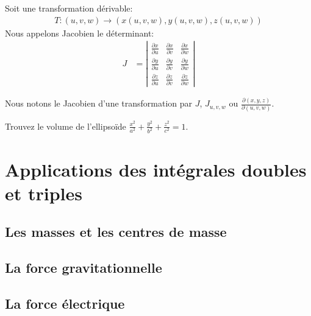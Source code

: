 \documentclass[]{book}
\theoremstyle{definition}
\theoremstyle{definition}
\theoremstyle{definition}
\theoremstyle{remark}
\let\BeginKnitrBlock\begin \let\EndKnitrBlock\end
\begin{document}
\BeginKnitrBlock{definition}
\protect\hypertarget{def:unnamed-chunk-288}{}{\label{def:unnamed-chunk-288}
}Soit une transformation dérivable: \begin{align*}
T:(u,v,w)\rightarrow (x(u,v,w),y(u,v,w),z(u,v,w))
\end{align*} Nous appelons Jacobien le déterminant: \begin{align*}
J&=\left|\begin{array}{ccc}
\frac{\partial x}{\partial u} & \frac{\partial x}{\partial v} & \frac{\partial x}{\partial w} \\
\frac{\partial y}{\partial u} & \frac{\partial y}{\partial v} & \frac{\partial y}{\partial w} \\
\frac{\partial z}{\partial u} & \frac{\partial z}{\partial v} & \frac{\partial z}{\partial w}
\end{array}\right|
\end{align*}
\EndKnitrBlock{definition}

\BeginKnitrBlock{remark}
{}Nous notons le Jacobien d'une
transformation par \(J\), \(J_{u,v,w}\) ou
\(\frac{\partial (x,y,z)}{\partial (u,v,w)}\).
\EndKnitrBlock{remark}

\BeginKnitrBlock{example}
\protect\hypertarget{exm:unnamed-chunk-290}{}{\label{exm:unnamed-chunk-290}
}Trouvez le volume de l'ellipsoïde
\(\frac{x^2}{a^2}+\frac{y^2}{b^2}+\frac{z^2}{c^2}=1\).
\EndKnitrBlock{example}
\vspace*{5cm}

\hypertarget{applicationsintegration}{%
\chapter{Applications des intégrales doubles et
triples}\label{applicationsintegration}}

\hypertarget{les-masses-et-les-centres-de-masse}{%
\section{Les masses et les centres de
masse}\label{les-masses-et-les-centres-de-masse}}

\hypertarget{la-force-gravitationnelle}{%
\section{La force gravitationnelle}\label{la-force-gravitationnelle}}

\hypertarget{la-force-electrique}{%
\section{La force électrique}\label{la-force-electrique}}


\end{document}
